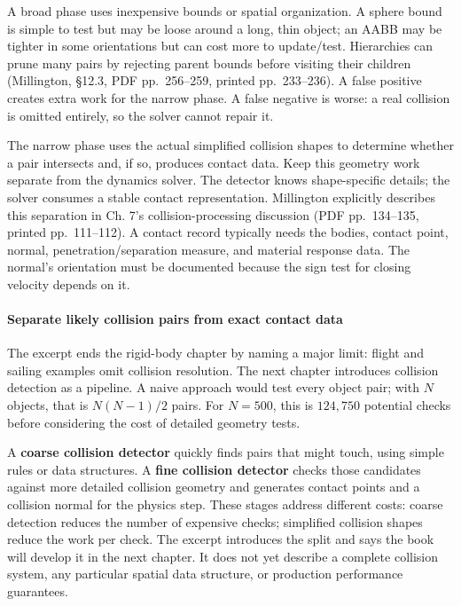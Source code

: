 A broad phase uses inexpensive bounds or spatial organization. A sphere bound is simple to test but may be loose around a long, thin object; an AABB may be tighter in some orientations but can cost more to update/test. Hierarchies can prune many pairs by rejecting parent bounds before visiting their children (Millington, §12.3, PDF pp.~256--259, printed pp.~233--236). A false positive creates extra work for the narrow phase. A false negative is worse: a real collision is omitted entirely, so the solver cannot repair it.

The narrow phase uses the actual simplified collision shapes to determine whether a pair intersects and, if so, produces contact data. Keep this geometry work separate from the dynamics solver. The detector knows shape-specific details; the solver consumes a stable contact representation. Millington explicitly describes this separation in Ch. 7's collision-processing discussion (PDF pp.~134--135, printed pp.~111--112). A contact record typically needs the bodies, contact point, normal, penetration/separation measure, and material response data. The normal's orientation must be documented because the sign test for closing velocity depends on it.

\paragraph{Separate likely collision pairs from exact contact data}\label{separate-likely-collision-pairs-from-exact-contact-data}

The excerpt ends the rigid-body chapter by naming a major limit: flight and sailing examples omit collision resolution. The next chapter introduces collision detection as a pipeline. A naive approach would test every object pair; with \(N\) objects, that is \(N(N-1)/2\) pairs. For \(N=500\), this is \(124{,}750\) potential checks before considering the cost of detailed geometry tests.

A \textbf{coarse collision detector} quickly finds pairs that might touch, using simple rules or data structures. A \textbf{fine collision detector} checks those candidates against more detailed collision geometry and generates contact points and a collision normal for the physics step. These stages address different costs: coarse detection reduces the number of expensive checks; simplified collision shapes reduce the work per check. The excerpt introduces the split and says the book will develop it in the next chapter. It does not yet describe a complete collision system, any particular spatial data structure, or production performance guarantees.


